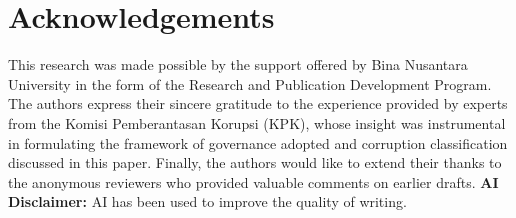 \documentclass[3p,times,procedia]{elsarticle}
\begin{document}
\section*{Acknowledgements}
This research was made possible by the support offered by Bina Nusantara University in the form of the Research and Publication Development Program. The authors express their sincere gratitude to the experience provided by experts from the Komisi Pemberantasan Korupsi (KPK), whose insight was instrumental in formulating the framework of governance adopted and corruption classification discussed in this paper. Finally, the authors would like to extend their thanks to the anonymous reviewers who provided valuable comments on earlier drafts. \textbf{AI Disclaimer:} AI has been used to improve the quality of writing.
\end{document}
